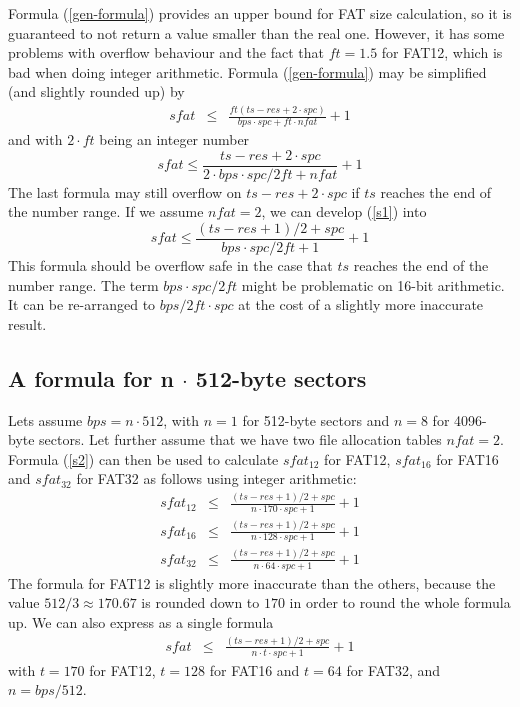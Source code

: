 \documentclass[12pt]{scrartcl}
\begin{document}
Formula (\ref{gen-formula}) provides an upper bound for FAT size calculation, so it is guaranteed to not return a value smaller than the real one. However, it has some problems with overflow behaviour and the fact that $ft = 1.5$ for FAT12, which is bad when doing integer arithmetic. Formula (\ref{gen-formula}) may be simplified (and slightly rounded up) by
\begin{eqnarray}
sfat &\le& \frac{ft(ts - res + 2 \cdot spc)}{bps \cdot spc + ft \cdot nfat} + 1 \nonumber
\end{eqnarray}
and with $2 \cdot ft$ being an integer number
\begin{equation}
\label{s1}
sfat \le \frac{ts - res + 2 \cdot spc}{2 \cdot bps \cdot spc / 2 ft + nfat} + 1
\end{equation}
The last formula may still overflow on $ts - res + 2 \cdot spc$ if $ts$ reaches the end of the number range. If we assume $nfat = 2$, we can develop (\ref{s1}) into
\begin{equation}
\label{s2}
sfat \le \frac{(ts - res + 1) / 2 + spc}{bps \cdot spc / 2 ft + 1} + 1
\end{equation}
This formula should be overflow safe in the case that $ts$ reaches the end of the number range. The term $bps \cdot spc / 2 ft$ might be problematic on 16-bit arithmetic. It can be re-arranged to $bps / 2 ft \cdot spc$ at the cost of a slightly more inaccurate result.


\subsection{A formula for n $\cdot$ 512-byte sectors}
Lets assume $bps = n \cdot 512$, with $n = 1$ for 512-byte sectors and $n = 8$ for 4096-byte sectors. Let further assume that we have two file allocation tables $nfat = 2$. Formula (\ref{s2}) can then be used to calculate $sfat_{12}$ for FAT12, $sfat_{16}$ for FAT16 and $sfat_{32}$ for FAT32 as follows using integer arithmetic:
\begin{eqnarray}
sfat_{12} &\le& \frac{(ts - res + 1) / 2 + spc}{n \cdot 170\cdot spc + 1} + 1\\
sfat_{16} &\le& \frac{(ts - res + 1) / 2 + spc}{n \cdot 128 \cdot spc + 1} + 1\\
sfat_{32} &\le& \frac{(ts - res + 1) / 2 + spc}{n \cdot 64 \cdot spc + 1} + 1
\end{eqnarray}
The formula for FAT12 is slightly more inaccurate than the others, because the value $512 / 3 \approx 170.67$ is rounded down to $170$ in order to round the whole formula up. We can also express as a single formula
\begin{eqnarray}
\label{final-formula}
sfat &\le& \frac{(ts - res + 1) / 2 + spc}{n \cdot t \cdot spc + 1} + 1
\end{eqnarray}
with $t = 170$ for FAT12, $t = 128$ for FAT16 and $t = 64$ for FAT32, and $n = bps / 512$.
\end{document}
